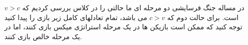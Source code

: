 در مساله جنگ فرسایشی دو مرحله ای ما حالتی را در کلاس بررسی کردیم که 
$v > c$
 است. برای حالت دوم که 
$c > v$
می باشد، تمام تعادلهای کامل زیر بازی را پیدا کنید توجه کنید که ممکن است بازیکن ها در یک مرحله استراتژی میکس بازی کنند، اما در یک مرحله خالص بازی کنند.
